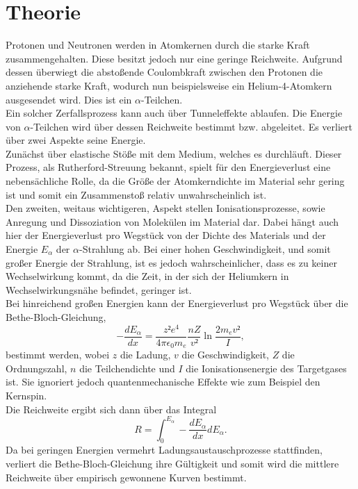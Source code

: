 \section{Theorie}
\label{sec:Theorie}

Protonen und Neutronen werden in Atomkernen durch die starke Kraft zusammengehalten.
Diese besitzt jedoch nur eine geringe Reichweite.
Aufgrund dessen überwiegt die abstoßende Coulombkraft zwischen den Protonen die anziehende starke Kraft, wodurch nun beispielsweise ein Helium-4-Atomkern ausgesendet wird.
Dies ist ein $\alpha$-Teilchen.\\
Ein solcher Zerfallsprozess kann auch über Tunneleffekte ablaufen.
Die Energie von $\alpha$-Teilchen wird über dessen Reichweite bestimmt bzw. abgeleitet.
Es verliert über zwei Aspekte seine Energie.\\
Zunächst über elastische Stöße mit dem Medium, welches es durchläuft.
Dieser Prozess, als Rutherford-Streuung bekannt, spielt für den Energieverlust eine nebensächliche Rolle, da die Größe der Atomkerndichte im Material sehr gering ist und somit ein Zusammenstoß relativ unwahrscheinlich ist.\\
Den zweiten, weitaus wichtigeren, Aspekt stellen Ionisationsprozesse, sowie Anregung und Dissoziation von Molekülen im Material dar.
Dabei hängt auch hier der Energieverlust pro Wegstück von der Dichte des Materials und der Energie $E_{\alpha}$ der $\alpha$-Strahlung ab.
Bei einer hohen Geschwindigkeit, und somit großer Energie der Strahlung, ist es jedoch wahrscheinlicher, dass es zu keiner Wechselwirkung kommt, da die Zeit, in der sich der Heliumkern in Wechselwirkungsnähe befindet, geringer ist.\\
Bei hinreichend großen Energien kann der Energieverlust pro Wegstück über die Bethe-Bloch-Gleichung,
\begin{equation}
  -\frac{dE_{\alpha}}{dx} = \frac{z²e^4}{4 \pi \epsilon_0 m_e} \frac{nZ}{v²} \ln{\frac{2m_e v²}{I}},
\end{equation}
bestimmt werden, wobei $z$ die Ladung, $v$ die Geschwindigkeit, $Z$ die Ordnungszahl, $n$ die Teilchendichte und $I$ die Ionisationsenergie des Targetgases ist.
Sie ignoriert jedoch quantenmechanische Effekte wie zum Beispiel den Kernspin.\\
Die Reichweite ergibt sich dann über das Integral
\begin{equation}
  R = \int_0^{E_{\alpha}} -\frac{dE_{\alpha}}{dx} dE_{\alpha}.
\end{equation}
Da bei geringen Energien vermehrt Ladungsaustauschprozesse stattfinden, verliert die Bethe-Bloch-Gleichung ihre Gültigkeit und somit wird die mittlere Reichweite über empirisch gewonnene Kurven bestimmt.
